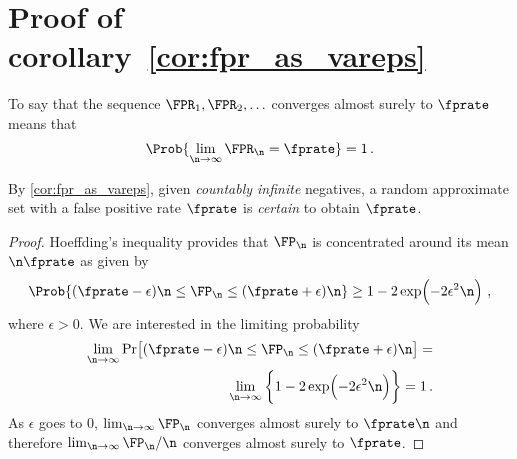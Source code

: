 \documentclass[ ../main.tex]{subfiles}
\begin{document}
	
\appendices
{

\section{Proof of corollary~\ref{cor:fpr_as_vareps}}
\label{app:cor_fpr_as_vareps}
To say that the sequence $\FPR_1,\FPR_2,\ldots$ converges almost surely to $\fprate$ means that
\begin{equation}
\Prob{\lim _{\n \to \infty} \FPR_\n = \fprate} = 1\,.
\end{equation}

By \cref{cor:fpr_as_vareps}, given \emph{countably infinite} negatives, a random approximate set with a false positive rate $\fprate$ is \emph{certain} to obtain $\fprate$.
\begin{proof}
Hoeffding's inequality\cite{hoeffding} provides that $\FP_\n$ is concentrated around its mean $\n \fprate$ as given by
\begin{equation}
\Prob{(\fprate -\epsilon) \n \leq \FP_\n \leq (\fprate + \epsilon )\n}
\geq 1 - 2 \exp\!\left(-2\epsilon ^{2} \n\right)\,,
\end{equation}
where $\epsilon > 0$.
We are interested in the limiting probability
\begin{equation}
\begin{split}
\lim_{\n \to \infty} \Pr\!\left[(\fprate -\epsilon) \n \leq 
\FP_\n \leq (\fprate + \epsilon)\n\right] =\\
\lim_{\n \to \infty} \left\{ 1 - 
2 \exp\!\left(-2\epsilon ^{2} \n\right) \right\} = 1\,.
\end{split}
\end{equation}
As $\epsilon$ goes to $0$, $\lim_{\n \to \infty} \FP_\n$ converges almost surely to $\fprate \n$ and therefore $\lim_{\n \to \infty} \FP_\n / \n$ converges almost surely to $\fprate$.
\end{proof}

}
\end{document}
